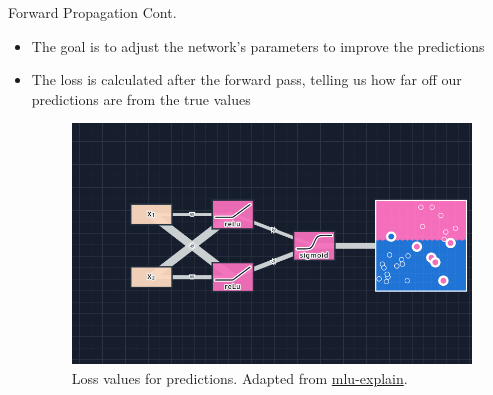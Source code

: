 \documentclass[serif, aspectratio=169]{beamer}
\begin{document}
\begin{frame}[t]{Forward Propagation Cont.}
    \begin{itemize}
        \item The goal is to adjust the network’s parameters to improve the predictions
        \item The loss is calculated after the forward pass, telling us how far off our predictions are from the true values
        \begin{figure}[bh]
            \centering
            \includegraphics[keepaspectratio, scale=0.25]{pic/4/loss-values.png} \\
            {\scriptsize Loss values for predictions. Adapted from \href{https://mlu-explain.github.io/neural-networks/}{mlu-explain}.}
        \end{figure}
    \end{itemize}
\end{frame}
\end{document}
